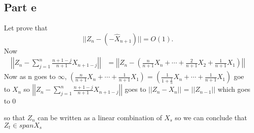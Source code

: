 \documentclass[11pt, oneside]{article}   	%
\begin{document}
\subsection{Part e}
Let prove that 
\begin{equation}
|| Z_{n}- (-\widehat{X}_{n+1})|| = O(1).
\end{equation}
Now 
\begin{equation}
\begin{split}
\left|\left| Z_{n}- \sum_{j=1}^{n}\frac{n+1-j}{n+1}X_{n+1-j}\right|\right| &= \left|\left| Z_{n}- \left(\frac{n}{n+1}X_{n}+ \cdots+\frac{2}{n+1}X_{2}+ \frac{1}{n+1}X_{1}\right)\right|\right|
\end{split}
\end{equation}
Now as n goes to $\infty$, $\left(\frac{n}{n+1}X_{n}+ \cdots+ \frac{1}{n+1}X_{1}\right)$ =  $\left(\frac{1}{1+\frac{1}{n}}X_{n}+ \cdots+ \frac{1}{n+1}X_{1}\right)$ goe to $X_{n}$ so 
$\left|\left| Z_{n}- \sum_{j=1}^{n}\frac{n+1-j}{n+1}X_{n+1-j}\right|\right| $ goes to $|| Z_{n}-X_{n} ||$ = $|| Z_{n-1} ||$ which goes to 0

so that $Z_{n}$ can be written as a linear combination of $X_{s}$ so we can conclude that $Z_{t} \in span{X_{s}}$
\end{document}
